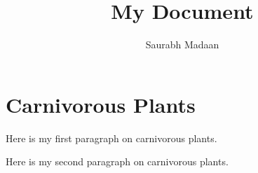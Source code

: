 \documentclass{article}
\begin{document}
\title{My Document} 
\author{Saurabh Madaan} 
\maketitle 

\tableofcontents

\section{Carnivorous Plants}

Here is my first paragraph on carnivorous plants.

Here is my second paragraph 
on carnivorous plants.
\end{document}
